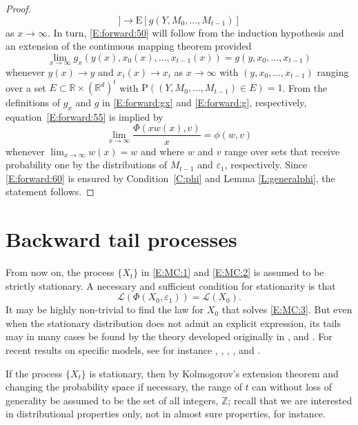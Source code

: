 \documentclass{aptpubarxiv}
\numberwithin{equation}{section}
\begin{document}
\begin{proof}
\begin{equation}
	\biggr]
	\to {\mathrm{E}} [ g(Y, M_0, \ldots, M_{t-1}) ]
\end{equation}
as $x \to \infty$. In turn, \eqref{E:forward:50} will follow from the induction hypothesis and an extension of the continuous mapping theorem \citep[][Theorem~18.11]{vdV98} provided
\begin{equation}
\label{E:forward:55}
	\lim_{x \to \infty} g_x( y(x), x_0(x), \ldots, x_{t-1}(x) ) = g( y, x_0, \ldots, x_{t-1} )
\end{equation}
whenever $y(x) \to y$ and $x_i(x) \to x_i$ as $x \to \infty$ with $(y, x_0, \ldots, x_{t-1})$ ranging over a set $E \subset {\mathbb{R}} \times ({\mathbb{R}}^d)^t$ with ${\mathrm{P}}((Y, M_0, \ldots, M_{t-1}) \in E) = 1$. From the definitions of $g_x$ and $g$ in \eqref{E:forward:gx} and \eqref{E:forward:g}, respectively, equation~\eqref{E:forward:55} is implied by
\begin{equation}
\label{E:forward:60}
	\lim_{x \to \infty} \frac{\Phi(x w(x), v)}{x} = \phi(w,v)
\end{equation}
whenever $\lim_{x \to \infty} w(x) = w$ and where $w$ and $v$ range over sets that receive probability one by the distributions of $M_{t-1}$ and ${\varepsilon}_1$, respectively. Since \eqref{E:forward:60} is ensured by Condition~\ref{C:phi} and Lemma \ref{L:generalphi}, the statement follows. 
\end{proof}

\section{Backward tail processes}
\label{S:backforth}

From now on, the process $\{ X_t \}$ in \eqref{E:MC:1} and \eqref{E:MC:2} is assumed to be strictly stationary. A necessary and sufficient condition for stationarity is that 
\begin{equation}
\label{E:MC:3}
	{\mathcal{L}}(\Phi(X_0, {\varepsilon}_1)) = {\mathcal{L}}(X_0).
\end{equation}
It may be highly non-trivial to find the law for $X_0$ that solves \eqref{E:MC:3}. But even when the stationary distribution does not admit an explicit expression, its tails may in many cases be found by the theory developed originally in \citet{Kesten73}, \citet{Letac86} and \citet{Goldie91}. For recent results on specific models, see for instance \citet{KluPer03, KluPer04}, \citet{DeSa04}, \citet{Mirek11}, \citet{Bura12}, and \citet{CV13}.

If the process $\{ X_t \}$ is stationary, then by Kolmogorov's extension theorem and changing the probability space if necessary, the range of $t$ can without loss of generality be assumed to be the set of all integers, ${\mathbb{Z}}$; recall that we are interested in distributional properties only, not in almost sure properties, for instance.
\end{document}

